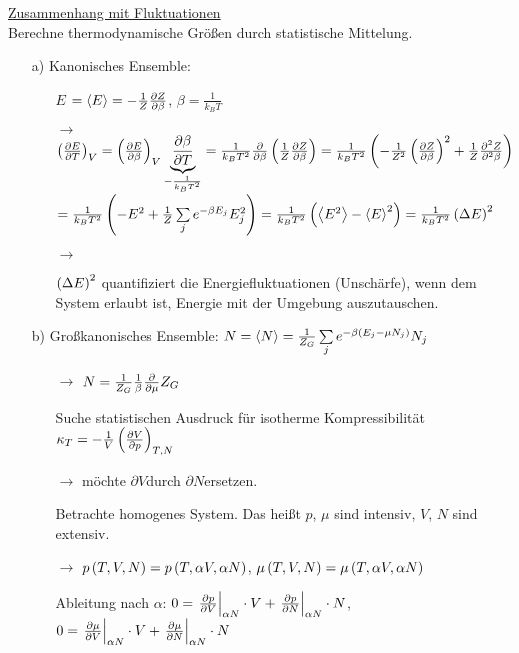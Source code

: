 \uline{Zusammenhang mit Fluktuationen}\\
Berechne thermodynamische Größen durch statistische Mittelung.
\begin{itemize}[align=left]
  \item[a) Kanonisches Ensemble:]\begin{itemize}[align=left]
    \item[$E$] $= \left\langle E \right\rangle = - \frac{1}{Z} \frac{\partial Z}{\partial \beta}$, $\beta = \frac{1}{k_B T}$
    \item[$\rightarrow$] $\left(\frac{\partial E}{\partial T}\right)_{V} = \left(\frac{\partial E}{\partial \beta}\right)_{V} \underbrace{\frac{\partial \beta}{\partial T}}_{-\frac{1}{k_B T^2}} = \frac{1}{k_B T^2} \frac{\partial }{\partial \beta} \left( \frac{1}{Z}\frac{\partial Z}{\partial \beta} \right) = \frac{1}{k_B T^2} \left( -\frac{1}{Z^2}\left( \frac{\partial Z}{\partial \beta} \right)^2 + \frac{1}{Z} \frac{\partial^{2} Z}{\partial^{2} \beta} \right)$\\ $= \frac{1}{k_B T^2} \left( -E^2 + \frac{1}{Z}\sum\limits_j e^{-\beta E_j}E_j^2 \right) = \frac{1}{k_B T^2} \left( \left\langle E^2 \right\rangle-\left\langle E \right\rangle^2 \right) = \frac{1}{k_B T^2} \left( \Delta E \right)^2$
    \item[$\rightarrow$] 
    \item[$\left( \Delta E \right)^2$] quantifiziert die Energiefluktuationen (Unschärfe), wenn dem System erlaubt ist, Energie mit der Umgebung auszutauschen.
  \end{itemize}
  \item[b) Großkanonisches Ensemble:] $N = \left\langle N \right\rangle = \frac{1}{Z_G} \sum\limits_j e^{-\beta \left( E_j - \mu N_j \right)} N_j$
  \begin{itemize}[align=left]
    \item[$\rightarrow$] $N = \frac{1}{Z_G} \frac{1}{\beta} \frac{\partial }{\partial \mu} Z_G$
    \item[Suche] statistischen Ausdruck für isotherme Kompressibilität $\kappa_T = - \frac{1}{V} \left(\frac{\partial V}{\partial p}\right)_{T,N}$
    \item[$\rightarrow$] möchte \glqq$\partial V$\grqq durch \glqq$\partial N$\grqq ersetzen.
    \item[Betrachte] homogenes System. Das heißt $p$, $\mu$ sind intensiv, $V$, $N$ sind extensiv.
    \item[$\rightarrow$] $p\left( T,V,N \right) = p \left( T, \alpha V, \alpha N \right)$, $\mu\left( T,V,N \right) = \mu\left( T,\alpha V, \alpha N \right)$
    \item[Ableitung] nach $\alpha$: $0 = \left. \frac{\partial p}{\partial V}\right\rvert_{\alpha N}\cdot V + \left. \frac{\partial p}{\partial N}\right\rvert_{\alpha N}\cdot N$, $0 = \left. \frac{\partial \mu}{\partial V}\right\rvert_{\alpha N}\cdot V + \left. \frac{\partial \mu}{\partial N}\right\rvert_{\alpha N}\cdot N$

\end{itemize}
\end{itemize}
